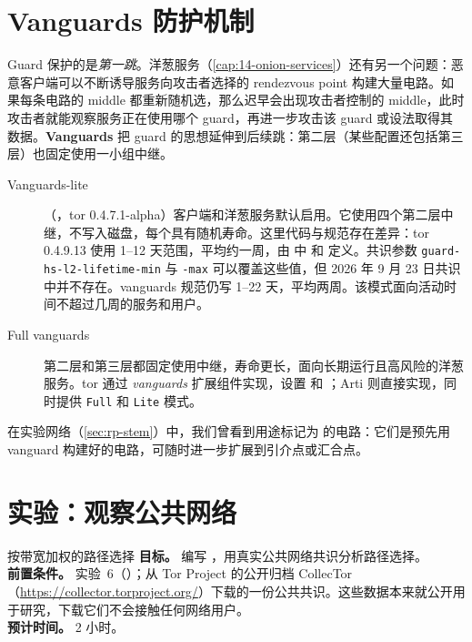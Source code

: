 \section{Vanguards 防护机制}\label{sec:vanguards}

Guard 保护的是\emph{第一跳}。洋葱服务（\cref{cap:14-onion-services}）还有另一个问题：恶意客户端可以不断诱导服务向攻击者选择的 rendezvous point 构建大量电路。如果每条电路的 middle 都重新随机选，那么迟早会出现攻击者控制的 middle，此时攻击者就能观察服务正在使用哪个 guard，再进一步攻击该 guard 或设法取得其数据。\textbf{Vanguards} 把 guard 的思想延伸到后续跳：第二层（某些配置还包括第三层）也固定使用一小组中继。

\begin{description}
  \item[Vanguards-lite]（，tor 0.4.7.1-alpha）客户端和洋葱服务默认启用。它使用四个第二层中继，不写入磁盘，每个具有随机寿命。这里代码与规范存在差异：tor 0.4.9.13 使用 1--12 天范围，平均约一周，由  中  和  定义。共识参数 \texttt{guard-hs-l2-lifetime-min} 与 \texttt{-max} 可以覆盖这些值，但 2026 年 9 月 23 日共识中并不存在。vanguards 规范仍写 1--22 天，平均两周。该模式面向活动时间不超过几周的服务和用户。
  \item[Full vanguards] 第二层和第三层都固定使用中继，寿命更长，面向长期运行且高风险的洋葱服务。tor 通过 \emph{vanguards} 扩展组件实现，设置  和 ；Arti 则直接实现，同时提供 \texttt{Full} 和 \texttt{Lite} 模式。
\end{description}

在实验网络（\cref{sec:rp-stem}）中，我们曾看到用途标记为  的电路：它们是预先用 vanguard 构建好的电路，可随时进一步扩展到引介点或汇合点。

\section{实验：观察公共网络}\label{sec:lab-percorso}

\begin{laboratorio}[7]{按带宽加权的路径选择}
\textbf{目标。} 编写 ，用真实公共网络共识分析路径选择。\\
\textbf{前置条件。} 实验~6（）；从 Tor Project 的公开归档 CollecTor（\url{https://collector.torproject.org/}）下载的一份公共共识。这些数据本来就公开用于研究，下载它们不会接触任何网络用户。\\
\textbf{预计时间。} 2 小时。
\end{laboratorio}


